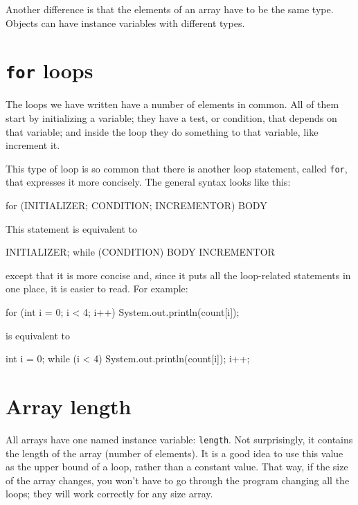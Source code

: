 Another difference is that the
elements of an array have to be the same type.  Objects can
have instance variables with different types.


\section{{\tt for} loops}
\label{for}

The loops we have written have a number of elements
in common.  All of them start by initializing a variable;
they have a test, or condition, that depends on that variable;
and inside the loop they do something to that variable,
like increment it.


This type of loop is so common that there is another
loop statement, called {\tt for}, that expresses it more
concisely.  The general syntax looks like this:

\begin{code}
    for (INITIALIZER; CONDITION; INCREMENTOR) {
        BODY
    }
\end{code}
%
This statement is equivalent to

\begin{code}
    INITIALIZER;
    while (CONDITION) {
        BODY
        INCREMENTOR
    }
\end{code}
%
except that it is more concise and, since it puts all the
loop-related statements in one place, it is easier to read.
For example:

\begin{code}
    for (int i = 0; i < 4; i++) {
        System.out.println(count[i]);
    }
\end{code}
%
is equivalent to

\begin{code}
    int i = 0;
    while (i < 4) {
        System.out.println(count[i]);
        i++;
    }
\end{code}


\section{Array length}

All arrays have one named instance variable: {\tt length}.
Not surprisingly, it contains the length of the array (number
of elements).  It is a good idea to use this value as the upper
bound of a loop, rather than a constant value.  That way, if
the size of the array changes, you won't have to go through the
program changing all the loops; they will work correctly for any
size array.

